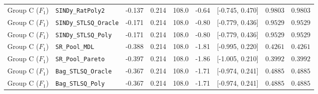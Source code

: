 \begin{table}[t]
\begin{tabular}{llccccccc}
Group C ($F_1$) & \texttt{SINDy\_RatPoly2} & -0.137 & 0.214 & 108.0 & -0.64 & [-0.745, 0.470] & $0.9803$ & $0.9803$ \\
Group C ($F_1$) & \texttt{SINDy\_STLSQ\_Oracle} & -0.171 & 0.214 & 108.0 & -0.80 & [-0.779, 0.436] & $0.9529$ & $0.9529$ \\
Group C ($F_1$) & \texttt{SINDy\_STLSQ\_Poly} & -0.171 & 0.214 & 108.0 & -0.80 & [-0.779, 0.436] & $0.9529$ & $0.9529$ \\
Group C ($F_1$) & \texttt{SR\_Pool\_MDL} & -0.388 & 0.214 & 108.0 & -1.81 & [-0.995, 0.220] & $0.4261$ & $0.4261$ \\
Group C ($F_1$) & \texttt{SR\_Pool\_Pareto} & -0.397 & 0.214 & 108.0 & -1.86 & [-1.005, 0.210] & $0.3992$ & $0.3992$ \\
Group C ($F_1$) & \texttt{Bag\_STLSQ\_Oracle} & -0.367 & 0.214 & 108.0 & -1.71 & [-0.974, 0.241] & $0.4885$ & $0.4885$ \\
Group C ($F_1$) & \texttt{Bag\_STLSQ\_Poly} & -0.367 & 0.214 & 108.0 & -1.71 & [-0.974, 0.241] & $0.4885$ & $0.4885$ \\
\bottomrule
\end{tabular}
\end{table}
